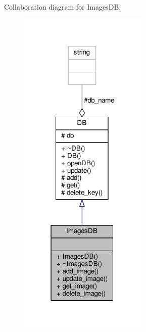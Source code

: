 Collaboration diagram for Images\+DB\+:\nopagebreak
\begin{figure}[H]
\begin{center}
\leavevmode
\includegraphics[width=175pt]{d6/d3f/classImagesDB__coll__graph}
\end{center}
\end{figure}
